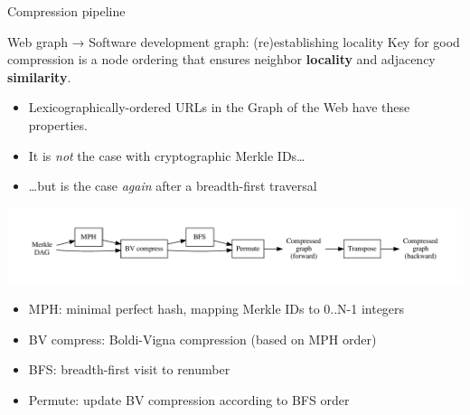 \documentclass[aspectratio=169,xcolor=table]{beamer}
\begin{document}
    \begin{frame}{Compression pipeline}
        \begin{block}{Web graph → Software development graph: (re)establishing locality}
            Key for good compression is a \alert{node ordering} that ensures
            neighbor \textbf{locality} and adjacency \textbf{similarity}.
            \begin{itemize}
                \item Lexicographically-ordered URLs in the Graph of the Web
                    have these properties.
                \item It is \emph{not} the case with cryptographic Merkle
                    IDs\ldots{}
                \item \ldots{}but is the case \emph{again} after a
                    breadth-first traversal
            \end{itemize}
        \end{block}
        \vspace{-0.7cm}
        \begin{center}
            \includegraphics[width=1\linewidth]{../img/compression/compression_steps-nofiles}
        \end{center}
        \vspace{-1cm}
        \begin{itemize}
            \item \alert{MPH:} minimal perfect hash, mapping Merkle IDs to 0..N-1 integers
            \item \alert{BV compress:} Boldi-Vigna compression (based on MPH order)
            \item \alert{BFS:} breadth-first visit to renumber
            \item \alert{Permute:} update BV compression according to BFS order
        \end{itemize}
    \end{frame}
\end{document}
